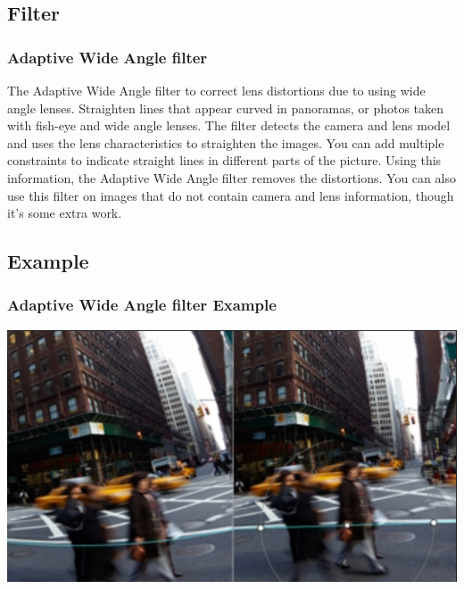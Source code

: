 \documentclass{beamer}
\begin{document}
			\subsection{Filter}		
			\begin{frame}
				\frametitle{Adaptive Wide Angle filter}
				\begin{outline}
					\1 The Adaptive Wide Angle filter to correct lens distortions due to using wide angle lenses.
					\1 Straighten lines that appear curved in panoramas, or photos taken with fish-eye and wide angle lenses.
					\1 The filter detects the camera and lens model and uses the lens characteristics to straighten the images. 
					\1 You can add multiple constraints to indicate straight lines in different parts of the picture. 
					\2 Using this information, the Adaptive Wide Angle filter removes the distortions.
					\2 You can also use this filter on images that do not contain camera and lens information, though it's some extra work.
				\end{outline}
			\end{frame}
		
		\subsection{Example}		
		\begin{frame}
			\frametitle{Adaptive Wide Angle filter Example}
			\includegraphics[width=1.0\textwidth]{images/Adaptive Wide Angle filter.png}
		\end{frame}
	
\end{document}
